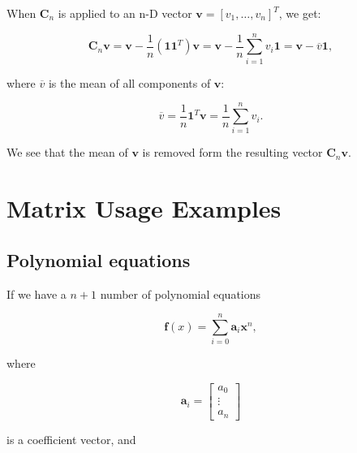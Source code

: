 \documentclass[10pt,b5paper,titlepage]{book}
\begin{document}
When $\mathbf{C}_{n}$ is applied to an n-D vector $\mathbf{v} = [v_{1}, \ldots, v_{n}]^{T}$,
we get:

\begin{equation}
    \mathbf{C}_{n}\mathbf{v} = \mathbf{v} - \frac{1}{n}(\mathbf{1}\mathbf{1}^{T})\mathbf{v}
    = \mathbf{v} - \frac{1}{n}
    \sum_{i=1}^{n} v_{i}\mathbf{1} = \mathbf{v} - \overline{v}\mathbf{1}
,\end{equation}

where $\overline{v}$ is the mean of all components of $\mathbf{v}$:

\begin{equation}
    \overline{v} = \frac{1}{n}\mathbf{1}^{T}\mathbf{v}
    = \frac{1}{n} \sum_{i=1}^{n} v_{i}
.\end{equation}

We see that the mean of $\mathbf{v}$ is removed form the resulting vector
$\mathbf{C}_{n}\mathbf{v}$.


















\chapter{Matrix Usage Examples}

\section{Polynomial equations}

If we have a $n + 1$ number of polynomial equations

\begin{equation}
    \mathbf{f}(x) = \sum_{i=0}^{n} \mathbf{a}_i \mathbf{x}^n
,\end{equation}

where

\begin{equation}
    \mathbf{a}_{i} =
    \begin{bmatrix}
        a_{0} \\
        \vdots \\
        a_{n}
    \end{bmatrix}
\end{equation}

is a coefficient vector, and
\end{document}

